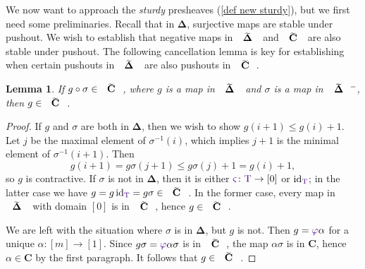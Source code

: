 \documentclass{amsart}
\makeatletter
\newcommand{\contr}{\mathbf{C}}
\newcommand{\simpl}{\mathbf{\Delta}}
\DeclareMathOperator{\id}{id}
\newcommand*\wt[1]{\mathpalette\wthelper{#1}}
\newcommand*\wthelper[2]{%
        \hbox{\dimen@\accentfontxheight#1%
                \accentfontxheight#11.3\dimen@
                $\m@th#1\widetilde{#2}$%
                \accentfontxheight#1\dimen@
        }%
}
\newcommand*\accentfontxheight[1]{%
        \fontdimen5\ifx#1\displaystyle
                \textfont
        \else\ifx#1\textstyle
                \textfont
        \else\ifx#1\scriptstyle
                \scriptfont
        \else
                \scriptscriptfont
        \fi\fi\fi3
}
\newcommand{\Tsimpl}{\wt\simpl}
\newcommand{\Tcontr}{\wt\contr}
\newcommand{\Tob}{\textup{\color{Indigo}T}}
\newcommand{\sigr}{{\color{Indigo}\varphi}}
\newcommand{\sigl}{{\color{Indigo}\varsigma}}
\newtheorem{lemma}[theorem]{Lemma}
\theoremstyle{definition}
\theoremstyle{noname}
\makeatother
\begin{document}
We now want to approach the \emph{sturdy} presheaves (\cref{def new sturdy}), but we first need some preliminaries.
Recall that in $\simpl$, surjective maps are stable under pushout.
We wish to establish that negative maps in $\Tsimpl$ and $\Tcontr$ are also stable under pushout.
The following cancellation lemma is key for establishing when certain pushouts in $\Tsimpl$ are also pushouts in $\Tcontr$.

\begin{lemma}\label{lem cancellation}
  If $g\circ\sigma \in \Tcontr$, where $g$ is a map in $\Tsimpl$ and $\sigma$ is a map
  in $\Tsimpl^-$, then $g\in \Tcontr$.
\end{lemma}
\begin{proof}
If $g$ and $\sigma$ are both in $\simpl$, then we wish to show $g(i+1) \leq g(i) + 1$.
Let $j$ be the maximal element of $\sigma^{-1}(i)$, which implies $j+1$ is the minimal element of $\sigma^{-1}(i+1)$.
Then
\[
  g(i+1) = g\sigma(j+1) \leq g\sigma(j) +1 = g(i) + 1,
\]
so $g$ is contractive.
If $\sigma$ is not in $\simpl$, then it is either $\sigl \colon \Tob \to [0]$ or $\id_\Tob$; in the latter case we have $g = g\id_\Tob = g\sigma \in \Tcontr$.
In the former case, every map in $\Tsimpl$ with domain $[0]$ is in $\Tcontr$, hence $g\in \Tcontr$.

We are left with the situation where $\sigma$ is in $\simpl$, but $g$ is not.
Then $g = \sigr \alpha$ for a unique $\alpha \colon [m] \to [1]$.
Since $g \sigma = \sigr \alpha \sigma$ is in $\Tcontr$, the map $\alpha \sigma$ is in $\contr$, hence $\alpha \in \contr$ by the first paragraph.
It follows that $g\in \Tcontr$.
\end{proof}
\end{document}
